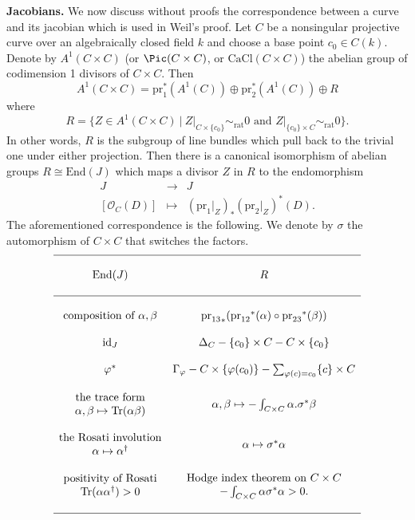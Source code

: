 {\bf Jacobians.}
We now discuss without proofs the correspondence between a curve and its
jacobian which is used in Weil's proof. Let $C$ be a nonsingular projective
curve over an algebraically closed field $k$ and choose a base point $c_0 \in
C(k)$. Denote by $A^1(C \times C)$ (or $\Pic(C \times C)$, or
$\text{CaCl}(C \times C)$) the abelian group of codimension 1 divisors of
$C \times C$. Then
$$
A^1(C \times C) = \text{pr}_1^* (A^1(C)) \oplus \text{pr}_2^* (A^1(C)) \oplus R
$$
where
$$
R = \{ Z \in A^1(C \times C) \ |
\ Z|_{C \times \{c_0\}} \sim_\text{rat} 0
\text{ and }
Z|_{\{c_0\} \times C} \sim_\text{rat} 0 \}.
$$
In other words,
$R$ is the subgroup of line bundles which pull back to the trivial one under
either projection. Then there is a canonical isomorphism of abelian groups $R
\cong \text{End}(J)$ which maps a divisor $Z$ in $R$ to the endomorphism
$$
\begin{matrix}
J & \to & J \\
\left[ \mathcal{O}_C(D) \right] & \mapsto & (\text{pr}_1 |_Z)_* (\text{pr}_2
|_Z)^* (D).
\end{matrix}
$$
The aforementioned correspondence is the following. We denote by $\sigma$ the
automorphism of $C \times C$ that switches the factors.
$$
\begin{matrix}
\hline & \\
\text{End}(J) & R \\
& \\
\hline & \\
\text{composition of }\alpha, \beta &
{\text{pr}_{13}}_* ({\text{pr}_{12}}^*(\alpha) \circ {\text{pr}_{23}}^*(\beta))
\\
& \\
\text{id}_J &
\Delta_C - \{c_0\} \times C - C \times \{c_0\} \\
& \\
\varphi^* &
\Gamma_\varphi - C \times \{\varphi(c_0)\}
- \sum_{\varphi(c) = c_0} \{c\} \times C \\
& \\
{
\begin{matrix}
\text{the trace form} \\
\alpha, \beta \mapsto \text{Tr}(\alpha \beta)
\end{matrix}
}
&
\alpha, \beta \mapsto - \int_{C \times C} \alpha . \sigma^*\beta
\\
& \\
{
\begin{matrix}
\text{the Rosati involution} \\
\alpha \mapsto \alpha^\dagger
\end{matrix}
}
&
\alpha \mapsto \sigma^*\alpha
\\
& \\
{
\begin{matrix}
\text{positivity of Rosati} \\
\text{Tr}(\alpha\alpha^\dagger) > 0
\end{matrix}
}
&
{
\begin{matrix}
\text{Hodge index theorem on }C \times C \\
- \int_{C \times C} \alpha \sigma^*\alpha > 0.
\end{matrix}
}
\\
& \\
\hline
\end{matrix}
$$
